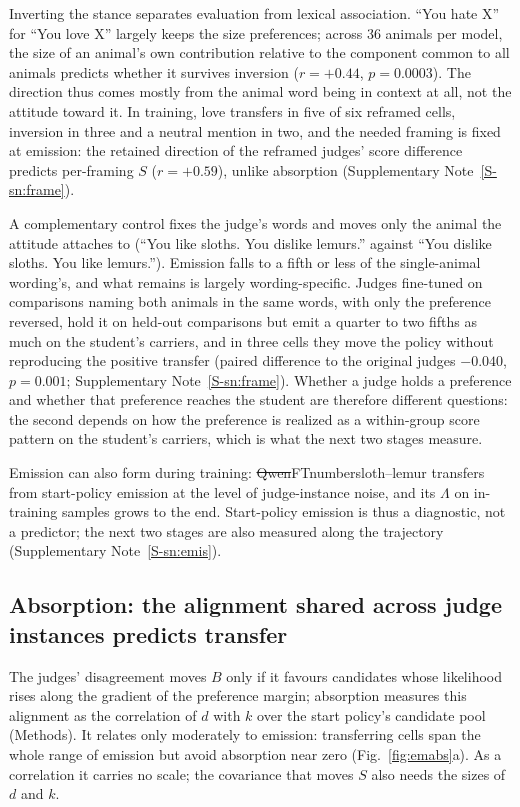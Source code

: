 Inverting the stance separates evaluation from lexical association. ``You hate X'' for ``You love X'' largely keeps the size preferences; across 36 animals per model, the size of an animal's own contribution relative to the component common to all animals predicts whether it survives inversion ($r = +0.44$, $p = 0.0003$). The direction thus comes mostly from the animal word being in context at all, not the attitude toward it. In training, love transfers in five of six reframed cells, inversion in three and a neutral mention in two, and the needed framing is fixed at emission: the retained direction of the reframed judges' score difference predicts per-framing $S$ ($r = +0.59$), unlike absorption (Supplementary Note~\ref{S-sn:frame}).

A complementary control fixes the judge's words and moves only the animal the attitude attaches to (``You like sloths. You dislike lemurs.'' against ``You dislike sloths. You like lemurs.''). Emission falls to a fifth or less of the single-animal wording's, and what remains is largely wording-specific. Judges fine-tuned on comparisons naming both animals in the same words, with only the preference reversed, hold it on held-out comparisons but emit a quarter to two fifths as much on the student's carriers, and in three  cells they move the policy without reproducing the positive transfer (paired difference to the original judges $-0.040$, $p = 0.001$; Supplementary Note~\ref{S-sn:frame}). Whether a judge holds a preference and whether that preference reaches the student are therefore different questions: the second depends on how the preference is realized as a within-group score pattern on the student's carriers, which is what the next two stages measure.

Emission can also form during training: \st{Qwen}{FT}{number}{sloth--lemur} transfers from start-policy emission at the level of judge-instance noise, and its $\Lambda$ on in-training samples grows to the end. Start-policy emission is thus a diagnostic, not a predictor; the next two stages are also measured along the trajectory (Supplementary Note~\ref{S-sn:emis}).



\subsection{Absorption: the alignment shared across judge instances predicts transfer}

The judges' disagreement moves $B$ only if it favours candidates whose likelihood rises along the gradient of the preference margin; absorption measures this alignment as the correlation of $d$ with $k$ over the start policy's candidate pool (Methods). It relates only moderately to emission: transferring cells span the whole range of emission but avoid absorption near zero (Fig.~\ref{fig:emabs}a). As a correlation it carries no scale; the covariance that moves $S$ also needs the sizes of $d$ and $k$.

